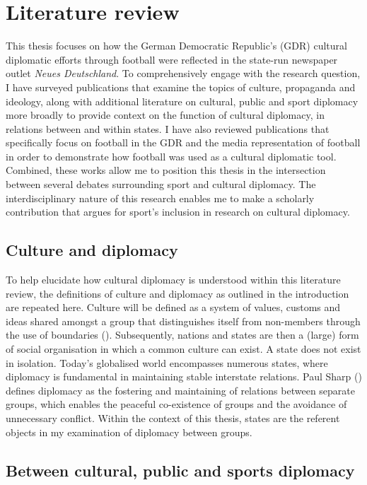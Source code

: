 \chapter{Literature review\label{cha:litreivew}}

This thesis focuses on how the German Democratic Republic’s (GDR) cultural diplomatic efforts through football were reflected in the state-run newspaper outlet \textit{Neues Deutschland}. To comprehensively engage with the research question, I have surveyed publications that examine the topics of culture, propaganda and ideology, along with additional literature on cultural, public and sport diplomacy more broadly to provide context on the function of cultural diplomacy, in relations between and within states. I have also reviewed publications that specifically focus on football in the GDR and the media representation of football in order to demonstrate how football was used as a cultural diplomatic tool. Combined, these works allow me to position this thesis in the intersection between several debates surrounding sport and cultural diplomacy. The interdisciplinary nature of this research enables me to make a scholarly contribution that argues for sport’s inclusion in research on cultural diplomacy.

\section{Culture and diplomacy}

To help elucidate how cultural diplomacy is understood within this literature review, the definitions of culture and diplomacy as outlined in the introduction are repeated here. Culture will be defined as a system of values, customs and ideas shared amongst a group that distinguishes itself from non-members through the use of boundaries (\cite{cohen1995}). Subsequently, nations and states are then a (large) form of social organisation in which a common culture can exist. A state does not exist in isolation. Today’s globalised world encompasses numerous states, where diplomacy is fundamental in maintaining stable interstate relations. Paul Sharp (\citeyear{sharp2003}) defines diplomacy as the fostering and maintaining of relations between separate groups, which enables the peaceful co-existence of groups and the avoidance of unnecessary conflict. Within the context of this thesis, states are the referent objects in my examination of diplomacy between groups.

\section{Between cultural, public and sports diplomacy}

